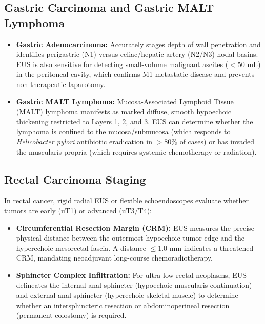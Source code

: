 \documentclass[11pt,a4paper]{article}
\begin{document}
\subsection{Gastric Carcinoma and Gastric MALT Lymphoma}
\begin{itemize}[leftmargin=2em]
    \item \textbf{Gastric Adenocarcinoma:} Accurately stages depth of wall penetration and identifies perigastric (N1) versus celiac/hepatic artery (N2/N3) nodal basins. EUS is also sensitive for detecting small-volume malignant ascites ($< 50\text{ mL}$) in the peritoneal cavity, which confirms M1 metastatic disease and prevents non-therapeutic laparotomy.
    \item \textbf{Gastric MALT Lymphoma:} Mucosa-Associated Lymphoid Tissue (MALT) lymphoma manifests as marked diffuse, smooth hypoechoic thickening restricted to Layers 1, 2, and 3. EUS can determine whether the lymphoma is confined to the mucosa/submucosa (which responds to \textit{Helicobacter pylori} antibiotic eradication in $> 80\%$ of cases) or has invaded the muscularis propria (which requires systemic chemotherapy or radiation).
\end{itemize}

\subsection{Rectal Carcinoma Staging}
In rectal cancer, rigid radial EUS or flexible echoendoscopes evaluate whether tumors are early (uT1) or advanced (uT3/T4):
\begin{itemize}[leftmargin=2em]
    \item \textbf{Circumferential Resection Margin (CRM):} EUS measures the precise physical distance between the outermost hypoechoic tumor edge and the hyperechoic mesorectal fascia. A distance $\le 1.0\text{ mm}$ indicates a threatened CRM, mandating neoadjuvant long-course chemoradiotherapy.
    \item \textbf{Sphincter Complex Infiltration:} For ultra-low rectal neoplasms, EUS delineates the internal anal sphincter (hypoechoic muscularis continuation) and external anal sphincter (hyperechoic skeletal muscle) to determine whether an intersphincteric resection or abdominoperineal resection (permanent colostomy) is required.
\end{itemize}
\end{document}
